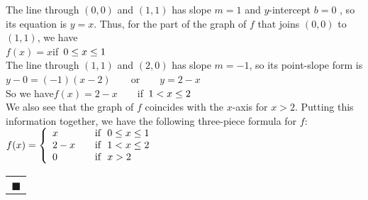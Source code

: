 \documentclass{sebase}
\begin{document}
\begin{Solution}
The line through $(0,0)$ and $(1,1)$ has slope $m=1$ and $y$-intercept $b=0$%
, so its equation is $y=x$. Thus, for the part of the graph of $f$ that
joins $(0,0)$ to $(1,1)$, we have\\[6pt]
\hspace*{\fill}$f(x)=x$\qquad if$%
\enskip%
0\leq x\leq 1$\hspace*{\fill}\\[6pt]
The line through $(1,1)$ and $(2,0)$ has slope $m=-1$, so
its point-slope form is\\[6pt]
\hspace*{\fill}$y-0=(-1)(x-2)\qquad $or$\qquad y=2-x$\hspace*{\fill}\\[6pt]
So we have\hspace*{\fill}$f(x)=2-x\qquad $if$%
\enskip%
1<x\leq 2$\hspace*{\fill}\\[6pt]
We also see that the graph of $f$ coincides with the $x$-axis for $x>2$.
Putting this information together, we have the following three-piece formula
for $f$:\\[8pt]
$\hspace*{\fill}f(x)=\left\{ 
\begin{array}{ll}
x & \text{if\ \ }0\leq x\leq 1\text{ } \\ 
2-x\quad & \text{if\ \ }1<x\leq 2 \\ 
0 & \text{if\ \ }x>2%
\end{array}%
\right. \hfill \vspace{-12pt}$%
\begin{tabular}{l}
\\ 
\\ 
$\blacksquare $%
\end{tabular}
\end{Solution}
\end{document}

